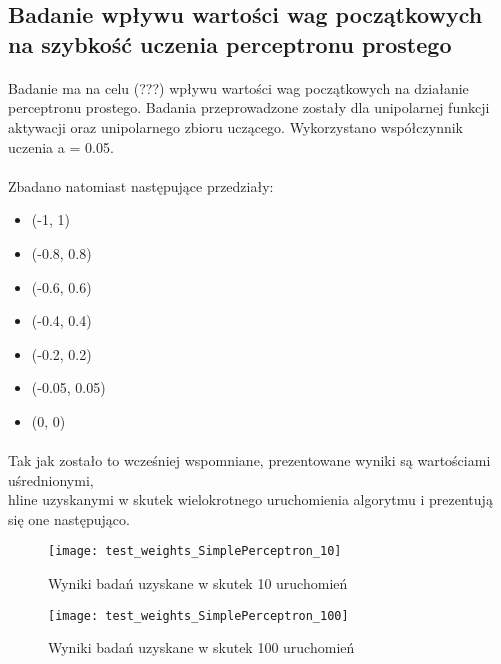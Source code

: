 \documentclass[\main/main.tex]{subfiles}
\begin{document}
    \justify
    \subsection{Badanie wpływu wartości wag początkowych na szybkość uczenia perceptronu prostego}
    \paragraph{}
    Badanie ma na celu (???) wpływu wartości wag początkowych na działanie perceptronu prostego. Badania przeprowadzone zostały dla unipolarnej funkcji aktywacji oraz unipolarnego zbioru uczącego. Wykorzystano współczynnik uczenia a = 0.05.
    
    \paragraph{}
    Zbadano natomiast następujące przedziały:
    \begin{itemize}
     \item (-1, 1)
     \item (-0.8,  0.8)
     \item (-0.6, 0.6)
     \item (-0.4, 0.4)
     \item (-0.2, 0.2)
     \item (-0.05, 0.05)
     \item (0, 0)
    \end{itemize}
    
    \paragraph{}
    Tak jak zostało to wcześniej wspomniane, prezentowane wyniki są wartościami uśrednionymi, \\hline
    uzyskanymi w skutek wielokrotnego uruchomienia algorytmu i prezentują się one następująco.

    \begin{figure}[H]
    \centering
    \texttt{[image: test\_weights\_SimplePerceptron\_10]}
    \caption{Wyniki badań uzyskane w skutek 10 uruchomień}
    \end{figure}

    \begin{figure}[H]
    \centering
    \texttt{[image: test\_weights\_SimplePerceptron\_100]}
    \caption{Wyniki badań uzyskane w skutek 100 uruchomień}
    \end{figure}
    
\end{document}
